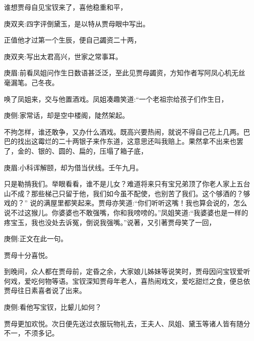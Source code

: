 \begin{parag}
    谁想贾母自见宝钗来了，喜他稳重和平，\begin{note}庚双夹:四字评倒黛玉，是以特从贾母眼中写出。\end{note}正值他才过第一个生辰，便自己蠲资二十两，\begin{note}庚双夹:写出太君高兴，世家之常事耳。\end{note}\begin{note}庚眉:前看凤姐问作生日数语甚泛泛，至此见贾母蠲资，方知作者写阿凤心机无丝毫漏笔。己冬夜。\end{note}唤了凤姐来，交与他置酒戏。凤姐凑趣笑道:“一个老祖宗给孩子们作生日，\begin{note}庚侧:家常话，却是空中楼阁，陡然架起。\end{note}不拘怎样，谁还敢争，又办什么酒戏。既高兴要热闹，就说不得自己花上几两。巴巴的找出这霉烂的二十两银子来作东道，这意思还叫我赔上。果然拿不出来也罢了，金的、银的、圆的、扁的，压塌了箱子底，\begin{note}庚眉:小科诨解颐，却为借当伏线。壬午九月。\end{note}只是勒掯我们。举眼看看，谁不是儿女？难道将来只有宝兄弟顶了你老人家上五台山不成？那些梯己只留于他，我们如今虽不配使，也别苦了我们。这个够酒的？够戏的？” 说的满屋里都笑起来。贾母亦笑道:“你们听听这嘴！我也算会说的，怎么说不过这猴儿。你婆婆也不敢强嘴，你和我嗙嗙的。”凤姐笑道:“我婆婆也是一样的疼宝玉，我也没处去诉冤，倒说我强嘴。”说著，又引著贾母笑了一回，\begin{note}庚侧:正文在此一句。\end{note}贾母十分喜悦。
\end{parag}


\begin{parag}
    到晚间，众人都在贾母前，定昏之余，大家娘儿姊妹等说笑时，贾母因问宝钗爱听何戏，爱吃何物等语。宝钗深知贾母年老人，喜热闹戏文，爱吃甜烂之食，便总依贾母往日素喜者说了出来。\begin{note}庚侧:看他写宝钗，比颦儿如何？\end{note}贾母更加欢悦。次日便先送过衣服玩物礼去，王夫人、凤姐、黛玉等诸人皆有随分不一，不须多记。
\end{parag}


